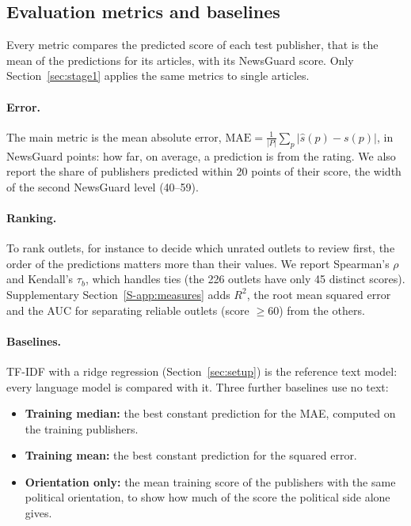 \documentclass[11pt,a4paper]{article}
\begin{document}
\subsection{Evaluation metrics and baselines}\label{sec:metrics}
Every metric compares the predicted score of each test publisher, that is the mean of the predictions for its
articles, with its NewsGuard score. Only Section~\ref{sec:stage1} applies the same metrics to single articles.

\paragraph{Error.} The main metric is the mean absolute error, $\mathrm{MAE} = \frac{1}{|P|} \sum_{p} |\hat{s}(p) -
s(p)|$, in NewsGuard points: how far, on average, a prediction is from the rating. We also report the share of
publishers predicted within 20 points of their score, the width of the second NewsGuard level (40--59).

\paragraph{Ranking.} To rank outlets, for instance to decide which unrated outlets to review first, the order of the
predictions matters more than their values. We report Spearman's $\rho$ and Kendall's $\tau_b$, which handles ties (the
226 outlets have only 45 distinct scores). Supplementary Section~\ref{S-app:measures} adds $R^2$, the root mean squared
error and the AUC for separating reliable outlets (score $\geq 60$) from the others.

\paragraph{Baselines.} TF-IDF with a ridge regression (Section~\ref{sec:setup}) is the reference text model: every
language model is compared with it. Three further baselines use no text:
\begin{itemize}
  \item \textbf{Training median:} the best constant prediction for the MAE, computed on the training publishers.
  \item \textbf{Training mean:} the best constant prediction for the squared error.
  \item \textbf{Orientation only:} the mean training score of the publishers with the same political orientation, to
        show how much of the score the political side alone gives.
\end{itemize}
\end{document}

